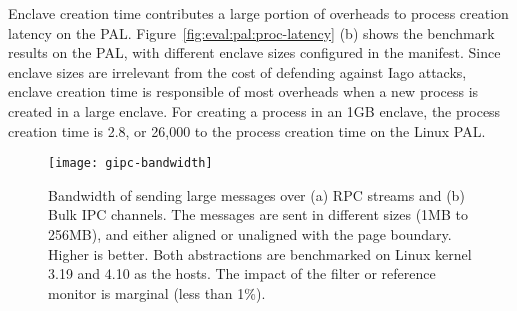 Enclave creation time contributes a large portion
of overheads
to process creation latency on the \sgx{} PAL.
Figure~\ref{fig:eval:pal:proc-latency} (b)
shows the benchmark results
on the \sgx{} PAL,
with different enclave sizes configured in the manifest.
Since enclave sizes are irrelevant from
the cost of defending against Iago attacks,
enclave creation time
is responsible of most overheads when a new process is created in a large enclave.
For creating a process in an 1GB enclave, the process creation time is \roughly{}2.8\asec{},
or 26,000\x{} to the process creation time
on the Linux PAL.






 








\begin{figure*}[t!]
\centering
\footnotesize
\texttt{[image: gipc-bandwidth]}
\caption{Bandwidth of sending large messages over (a) RPC streams and (b) Bulk IPC channels. The messages are sent in different sizes (1MB to 256MB), and either aligned or unaligned with the page boundary.
Higher is better. Both abstractions are benchmarked on Linux kernel 3.19 and 4.10 as the hosts. The impact of the \seccomp{} filter or reference monitor is marginal (less than 1\%).}
\label{fig:eval:pal:gipc-bandwidth}
\end{figure*}


